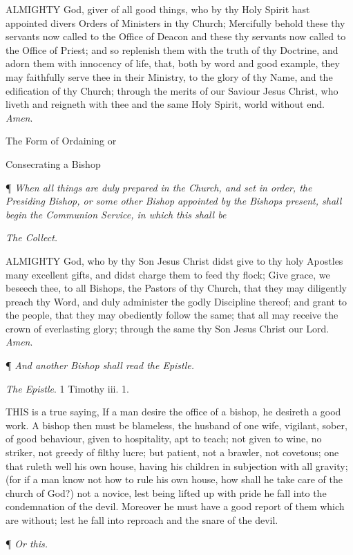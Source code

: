 ALMIGHTY God, giver of
all good things, who by thy Holy Spirit hast appointed divers Orders of
Ministers in thy Church; Mercifully behold these thy servants now called
to the Office of Deacon and these thy servants now called to the Office
of Priest; and so replenish them with the truth of thy Doctrine, and adorn
them with innocency of life, that, both by word and good example, they
may faithfully serve thee in their Ministry, to the glory of thy Name,
and the edification of thy Church; through the merits of our Saviour Jesus
Christ, who liveth and reigneth with thee and the same Holy Spirit, world
without end. \emph{Amen}.

The
Form of Ordaining or

Consecrating
a Bishop

¶
\emph{When all things are duly prepared in the Church, and set in order,
the Presiding Bishop, or some other Bishop appointed by the Bishops
present, shall begin the Communion Service, in which this shall be}

\emph{The
Collect.}

ALMIGHTY
God, who by thy Son Jesus Christ didst give to thy holy Apostles many
excellent gifts, and didst charge them to feed thy flock; Give grace,
we beseech thee, to all Bishops, the Pastors of thy Church, that they
may diligently preach thy Word, and duly administer the godly Discipline
thereof; and grant to the people, that they may obediently follow the
same; that all may receive the crown of everlasting glory; through the
same thy Son Jesus Christ our Lord. \emph{Amen}.

¶ \emph{And another Bishop shall read
the Epistle.}

\emph{The Epistle}. 1 Timothy iii. 1.

THIS is a true saying,
If a man desire the office of a bishop, he desireth a good work. A bishop
then must be blameless, the husband of one wife, vigilant, sober, of good
behaviour, given to hospitality, apt to teach; not given to wine, no striker,
not greedy of filthy lucre; but patient, not a brawler, not covetous;
one that ruleth well his own house, having his children in subjection
with all gravity; (for if a man know not how to rule his own house, how
shall he take care of the church of God?) not a novice, lest being lifted
up with pride he fall into the condemnation of the devil. Moreover he
must have a good report of them which are without; lest he fall into reproach
and the snare of the devil.

¶ \emph{Or this.}

